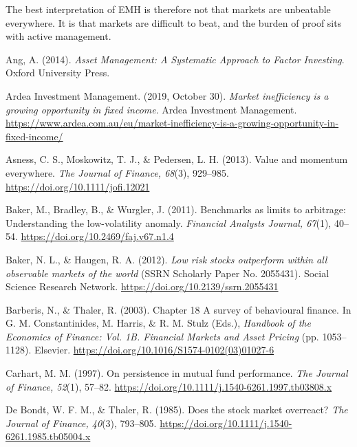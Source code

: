 \documentclass[11pt,a4paper]{article}
\begin{document}
The best interpretation of EMH is therefore not that markets are unbeatable everywhere. It is that markets are difficult to beat, and the burden of proof sits with active management.

\clearpage
\begin{fshfreferences}

\item Ang, A. (2014). \textit{Asset Management: A Systematic Approach to Factor Investing}. Oxford University Press.

\item Ardea Investment Management. (2019, October 30). \textit{Market inefficiency is a growing opportunity in fixed income}. Ardea Investment Management. \url{https://www.ardea.com.au/eu/market-inefficiency-is-a-growing-opportunity-in-fixed-income/}

\item Asness, C. S., Moskowitz, T. J., \& Pedersen, L. H. (2013). Value and momentum everywhere. \textit{The Journal of Finance, 68}(3), 929--985. \url{https://doi.org/10.1111/jofi.12021}

\item Baker, M., Bradley, B., \& Wurgler, J. (2011). Benchmarks as limits to arbitrage: Understanding the low-volatility anomaly. \textit{Financial Analysts Journal, 67}(1), 40--54. \url{https://doi.org/10.2469/faj.v67.n1.4}

\item Baker, N. L., \& Haugen, R. A. (2012). \textit{Low risk stocks outperform within all observable markets of the world} (SSRN Scholarly Paper No. 2055431). Social Science Research Network. \url{https://doi.org/10.2139/ssrn.2055431}

\item Barberis, N., \& Thaler, R. (2003). Chapter 18 A survey of behavioural finance. In G. M. Constantinides, M. Harris, \& R. M. Stulz (Eds.), \textit{Handbook of the Economics of Finance: Vol. 1B. Financial Markets and Asset Pricing} (pp. 1053--1128). Elsevier. \url{https://doi.org/10.1016/S1574-0102(03)01027-6}

\item Carhart, M. M. (1997). On persistence in mutual fund performance. \textit{The Journal of Finance, 52}(1), 57--82. \url{https://doi.org/10.1111/j.1540-6261.1997.tb03808.x}

\item De Bondt, W. F. M., \& Thaler, R. (1985). Does the stock market overreact? \textit{The Journal of Finance, 40}(3), 793--805. \url{https://doi.org/10.1111/j.1540-6261.1985.tb05004.x}


\end{fshfreferences}
\end{document}
